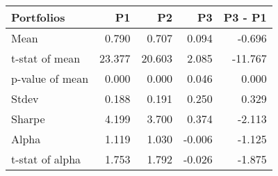 \begin{tabular}{lrrrr}
\toprule
Portfolios & P1 & P2 & P3 & P3 - P1 \\
\midrule
Mean & 0.790 & 0.707 & 0.094 & -0.696 \\
t-stat of mean & 23.377 & 20.603 & 2.085 & -11.767 \\
p-value of mean & 0.000 & 0.000 & 0.046 & 0.000 \\
Stdev & 0.188 & 0.191 & 0.250 & 0.329 \\
Sharpe & 4.199 & 3.700 & 0.374 & -2.113 \\
Alpha & 1.119 & 1.030 & -0.006 & -1.125 \\
t-stat of alpha & 1.753 & 1.792 & -0.026 & -1.875 \\
\bottomrule
\end{tabular}
